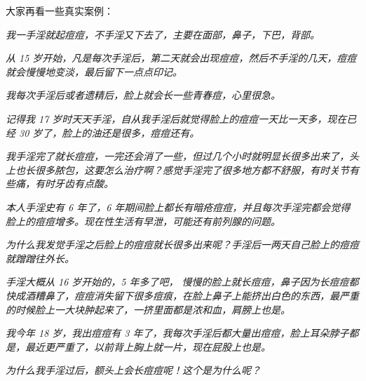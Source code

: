 大家再看一些真实案例：

\begin{case}[痘痘]\it
    我一手淫就起痘痘，不手淫又下去了，主要在面部，鼻子，下巴，背部。
\end{case}

\begin{case}[痘痘]\it
    从 15 岁开始，凡是每次手淫后，第二天就会出现痘痘，然后不手淫的几天，痘痘就会慢慢地变淡，最后留下一点点印记。
\end{case}

\begin{case}[痘痘]\it\label{DoudouCaseRef1}
    我每次手淫后或者遗精后，脸上就会长一些青春痘，心里很急。
\end{case}

\begin{case}[痘痘]\it
    记得我 17 岁时天天手淫，自从我手淫后就觉得脸上的痘痘一天比一天多，现在已经 30 岁了，脸上的油还是很多，痘痘还有。
\end{case}

\begin{case}[痘痘]\it\label{DoudouCaseRef2}
    我手淫完了就长痘痘，一完还会消了一些，但过几个小时就明显长很多出来了，头上也长很多脓包，这要怎么治疗啊？感觉手淫完了很多地方都不舒服，有时关节有些痛，有时牙齿有点酸。
\end{case}

\begin{case}[痘痘]\it
    本人手淫史有 6 年了，6 年期间脸上都长有暗疮痘痘，并且每次手淫完都会觉得脸上的痘痘增多。现在性生活有早泄，可能还有前列腺的问题。
\end{case}

\begin{case}[痘痘]\it
    为什么我发觉手淫之后脸上的痘痘就长很多出来呢？手淫后一两天自己脸上的痘痘就蹭蹭往外长。
\end{case}

\begin{case}[痘痘]\it
    手淫大概从 16 岁开始的，5 年多了吧， 慢慢的脸上就长痘痘，鼻子因为长痘痘都快成酒糟鼻了，痘痘消失留下很多痘痕，在脸上鼻子上能挤出白色的东西，最严重的时候脸上一大块肿起来了，一挤里面都是浓和血，肩膀上也是。
\end{case}

\begin{case}[痘痘]\it
    我今年 18 岁，我出痘痘有 3 年了，我每次手淫后都大量出痘痘，脸上耳朵脖子都是，最近更严重了，以前背上胸上就一片，现在屁股上也是。
\end{case}

\begin{case}[痘痘]\it
    为什么我手淫过后，额头上会长痘痘呢！这个是为什么呢？
\end{case}

